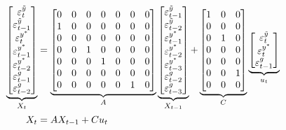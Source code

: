 \documentclass[a4paper,12pt]{article}
\begin{document}
\begin{align*}
\underbrace{%
\begin{bmatrix}
\varepsilon _{t}^{\tilde{y}} \\ 
\varepsilon _{t-1}^{\tilde{y}} \\ 
\varepsilon _{t}^{y^{\ast }} \\ 
\varepsilon _{t-1}^{y^{\ast }} \\ 
\varepsilon _{t-2}^{y^{\ast }} \\ 
\varepsilon _{t-1}^{g} \\ 
\varepsilon _{t-2}^{g}%
\end{bmatrix}%
}_{X_{t}}& =\underbrace{%
\begin{bmatrix}
0 & 0 & 0 & 0 & 0 & 0 & 0 \\ 
1 & 0 & 0 & 0 & 0 & 0 & 0 \\ 
0 & 0 & 0 & 0 & 0 & 0 & 0 \\ 
0 & 0 & 1 & 0 & 0 & 0 & 0 \\ 
0 & 0 & 0 & 1 & 0 & 0 & 0 \\ 
0 & 0 & 0 & 0 & 0 & 0 & 0 \\ 
0 & 0 & 0 & 0 & 0 & 1 & 0%
\end{bmatrix}%
}_{A}\underbrace{%
\begin{bmatrix}
\varepsilon _{t-1}^{\tilde{y}} \\ 
\varepsilon _{t-2}^{\tilde{y}} \\ 
\varepsilon _{t-1}^{y^{\ast }} \\ 
\varepsilon _{t-2}^{y^{\ast }} \\ 
\varepsilon _{t-3}^{y^{\ast }} \\ 
\varepsilon _{t-2}^{g} \\ 
\varepsilon _{t-3}^{g}%
\end{bmatrix}%
}_{X_{t-1}}+\underbrace{%
\begin{bmatrix}
1 & 0 & 0 \\ 
0 & 0 & 0 \\ 
0 & 1 & 0 \\ 
0 & 0 & 0 \\ 
0 & 0 & 0 \\ 
0 & 0 & 1 \\ 
0 & 0 & 0%
\end{bmatrix}%
}_{C}\underbrace{%
\begin{bmatrix}
\varepsilon _{t}^{\tilde{y}} \\ 
\varepsilon _{t}^{y^{\ast }} \\ 
\varepsilon _{t-1}^{g}%
\end{bmatrix}%
}_{u_{t}} \\
X_{t}& =AX_{t-1}+Cu_{t}
\end{align*}
\end{document}
